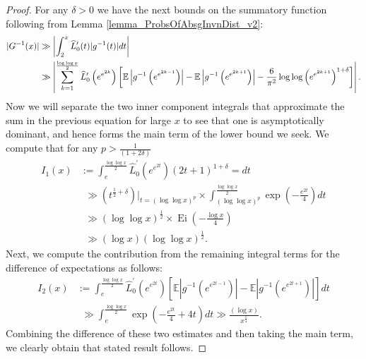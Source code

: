 \documentclass[11pt,reqno,a4letter]{article}
\numberwithin{figure}{section}
\numberwithin{table}{section}
\theoremstyle{plain}
\numberwithin{theorem}{section}
\theoremstyle{definition}
\begin{document}
\begin{proof}
For any $\delta > 0$ we have the next bounds on the summatory function 
following from Lemma \ref{lemma_ProbsOfAbsgInvnDist_v2}: 
\begin{align*} 
\notag 
|G^{-1}(x)| & \gg \left\lvert \int_2^x \widehat{L}_0^{\prime}(t) |g^{-1}(t)| dt \right\rvert \\ 
     & \gg \left\lvert \sum_{k=1}^{\frac{\log\log x}{2}} \widehat{L}_0^{\prime}\left(e^{e^{2k}}\right) \left[ 
     \mathbb{E}\left\lvert g^{-1}\left(e^{e^{2k-1}}\right) \right\rvert - 
     \mathbb{E}\left\lvert g^{-1}\left(e^{e^{2k+1}}\right) \right\rvert - 
     \frac{6}{\pi^2} \log\log\left(e^{e^{2k+1}}\right)^{1+\delta}  
     \right] \right\rvert. 
\end{align*} 
Now we will separate the two inner component integrals that approximate the 
sum in the previous equation for large $x$ 
to see that one is asymptotically dominant, and hence 
forms the main term of the lower bound we seek. 
We compute that for any $p > \frac{1}{(1+2\delta)}$ 
\begin{align*} 
I_1(x) & := \int_{e}^{\frac{\log\log x}{2}} \widehat{L}_0^{\prime}\left(e^{e^{2t}}\right) 
     (2t+1)^{1+\delta} = dt \\ 
     & \phantom{:} \gg \left(t^{\frac{1}{2}+\delta}\right) \Biggr\rvert_{t=(\log\log x)^{p}} \times 
     \int_{(\log\log x)^p}^{\frac{\log\log x}{2}} \exp\left(-\frac{e^{2t}}{4}\right) dt \\ 
     & \phantom{:} \gg (\log\log x)^{\frac{1}{2}} \times \operatorname{Ei}\left(-\frac{\log x}{4}\right) \\ 
     & \phantom{:} \gg (\log x) (\log\log x)^{\frac{1}{2}}. 
\end{align*} 
Next, we compute the contribution 
from the remaining integral terms for the difference of expectations as follows: 
\begin{align*} 
I_2(x) & := \int_{e}^{\frac{\log\log x}{2}} \widehat{L}_0^{\prime}\left(e^{e^{2t}}\right) \left[ 
     \mathbb{E}\left\lvert g^{-1}\left(e^{e^{2t-1}}\right) \right\rvert - 
     \mathbb{E}\left\lvert g^{-1}\left(e^{e^{2t+1}}\right) \right\rvert 
     \right] dt \\ 
     & \phantom{:} \gg 
     \int_{e}^{\frac{\log\log x}{2}} \exp\left(-\frac{e^{2t}}{4} + 4t\right) dt \gg 
     \frac{(\log x)}{x^{\frac{1}{4}}}. 
\end{align*} 
Combining the difference of these two estimates and then taking the main term, we clearly obtain that 
stated result follows. 
\end{proof} 
\end{document}

